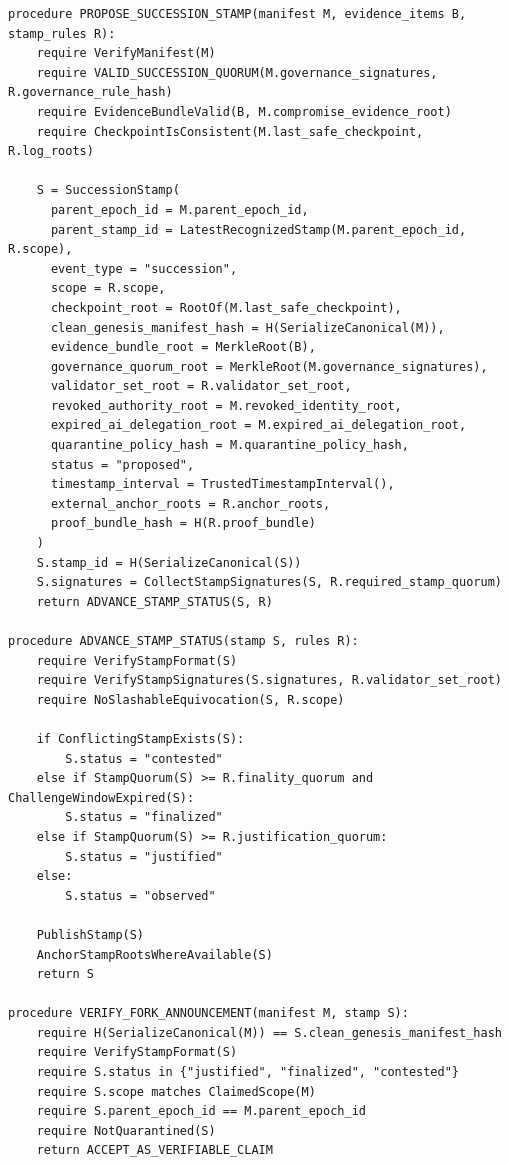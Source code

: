 \documentclass[11pt,letterpaper]{article}
\begin{document}
\begin{lstlisting}[caption={Succession stamp proposal and verification}]
procedure PROPOSE_SUCCESSION_STAMP(manifest M, evidence_items B, stamp_rules R):
    require VerifyManifest(M)
    require VALID_SUCCESSION_QUORUM(M.governance_signatures, R.governance_rule_hash)
    require EvidenceBundleValid(B, M.compromise_evidence_root)
    require CheckpointIsConsistent(M.last_safe_checkpoint, R.log_roots)

    S = SuccessionStamp(
      parent_epoch_id = M.parent_epoch_id,
      parent_stamp_id = LatestRecognizedStamp(M.parent_epoch_id, R.scope),
      event_type = "succession",
      scope = R.scope,
      checkpoint_root = RootOf(M.last_safe_checkpoint),
      clean_genesis_manifest_hash = H(SerializeCanonical(M)),
      evidence_bundle_root = MerkleRoot(B),
      governance_quorum_root = MerkleRoot(M.governance_signatures),
      validator_set_root = R.validator_set_root,
      revoked_authority_root = M.revoked_identity_root,
      expired_ai_delegation_root = M.expired_ai_delegation_root,
      quarantine_policy_hash = M.quarantine_policy_hash,
      status = "proposed",
      timestamp_interval = TrustedTimestampInterval(),
      external_anchor_roots = R.anchor_roots,
      proof_bundle_hash = H(R.proof_bundle)
    )
    S.stamp_id = H(SerializeCanonical(S))
    S.signatures = CollectStampSignatures(S, R.required_stamp_quorum)
    return ADVANCE_STAMP_STATUS(S, R)

procedure ADVANCE_STAMP_STATUS(stamp S, rules R):
    require VerifyStampFormat(S)
    require VerifyStampSignatures(S.signatures, R.validator_set_root)
    require NoSlashableEquivocation(S, R.scope)

    if ConflictingStampExists(S):
        S.status = "contested"
    else if StampQuorum(S) >= R.finality_quorum and ChallengeWindowExpired(S):
        S.status = "finalized"
    else if StampQuorum(S) >= R.justification_quorum:
        S.status = "justified"
    else:
        S.status = "observed"

    PublishStamp(S)
    AnchorStampRootsWhereAvailable(S)
    return S

procedure VERIFY_FORK_ANNOUNCEMENT(manifest M, stamp S):
    require H(SerializeCanonical(M)) == S.clean_genesis_manifest_hash
    require VerifyStampFormat(S)
    require S.status in {"justified", "finalized", "contested"}
    require S.scope matches ClaimedScope(M)
    require S.parent_epoch_id == M.parent_epoch_id
    require NotQuarantined(S)
    return ACCEPT_AS_VERIFIABLE_CLAIM
\end{lstlisting}
\end{document}
